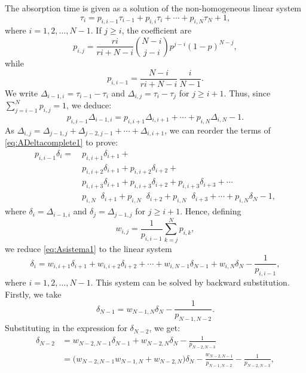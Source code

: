 \documentclass[a4paper,english,10pt]{amsart}
\theoremstyle{definition}
\numberwithin{equation}{section}
\begin{document}
The absorption time is given as a solution of the non-homogeneous linear system
\begin{equation}
  \label{eq:Asistema1}
	\tau_i = p_{i,i-1} \tau_{i-1} + p_{i,i} \tau_i + 
    \cdots + p_{i,N} \tau_N + 1,
\end{equation}
where $i = 1,2,\ldots,N-1$. If $j \geq i$, the coefficient are
$$
  p_{i,j}%
  = \frac{ri}{ri+N-i} \binom{N-i}{j-i} p^{j-i} (1-p)^{N-j},
$$
while
$$
  p_{i,i-1} = \frac{N-i}{ri+N-i}\,\frac{i}{N-1}. 
$$
We write $\Delta_{i-1,i} = \tau_{i-1} - \tau_i$ and $\Delta_{i,j} = \tau_{i} - \tau_{j}$ for $j \geq i+1$. Thus, since $\sum_{j =i-1}^N p_ {i,j} = 1$,
we deduce:
\begin{equation}
  \label{eq:ADeltacomplete1}
  p_{i,i-1} \Delta_{i-1,i} = p_{i,i+1}\Delta_{i,i+1} + 
 \cdots + p_{i,N}\Delta_{i,N} - 1.
\end{equation}
As
$\Delta_{i,j} = \Delta_{j-1,j} + \Delta_{j-2,j-1} + \cdots + \Delta_{i,i+1}$, 
we can reorder the terms of \eqref{eq:ADeltacomplete1} to prove:
\begin{align*}
p_{i,i-1} \delta_i =~ &  p_{i,i+1}\delta_{i+1} +  \\
 & p_{i,i+2}\delta_{i+1}  + p_{i,i+2}\delta_{i+2} + \\
 & p_{i,i+3}\delta_{i+1}  + p_{i,i+3}\delta_{i+2} + 
p_{i,i+3} \delta_{i+3} + \cdots \\
 & p_{i,N} \phantom{x} \delta_{i+1}  + p_{i,N}\phantom{x} \delta_{i+2}  + p_{i,N} \phantom{x}\delta_{i+3} + \cdots + p_{i,N}\delta_N - 1,
\end{align*}
where $\delta_i = \Delta_{i-1,i}$ and $\delta_{j} = \Delta_{j-1,j}$ for $j \geq i+1$.
Hence, defining 
$$
w_{i,j} = \frac1{ p_{i,i-1} }\sum_{k=j}^N p_{i,k},
$$
we reduce \eqref{eq:Asistema1} to the linear system
\begin{equation}
  \label{eq:Asistema2}
  \delta_i = w_{i,i+1} \delta_{i+1} + 
    w_{i,i+2} \delta_{i+2} + \cdots + w_{i,N-1} \delta_{N-1} + w_{i,N} \delta_{N} - \frac{1}{p_{i,i-1}},
\end{equation}
where $i = 1,2,\ldots,N-1$. This system can be solved by backward substitution. 
Firstly, we take 
$$\delta_{N-1} = w_{N-1,N}\delta_N -  \frac{1}{p_{N-1,N-2}}.$$ Substituting in the expression for $\delta_{N-2}$, we get:
\begin{align*}
  \delta_{N-2} & = w_{N-2,N-1} \delta_{N-1} + w_{N-2,N}\delta_N -  \frac{1}{p_{N-2,N-3}} \\ 
 & = \bigl(w_{N-2,N-1} w_{N-1,N} + w_{N-2,N}\bigr)\delta_N - \frac{w_{N-2,N-1}}{p_{N-1,N-2}} -  \frac{1}{p_{N-2,N-3}},
\end{align*}
\end{document}
